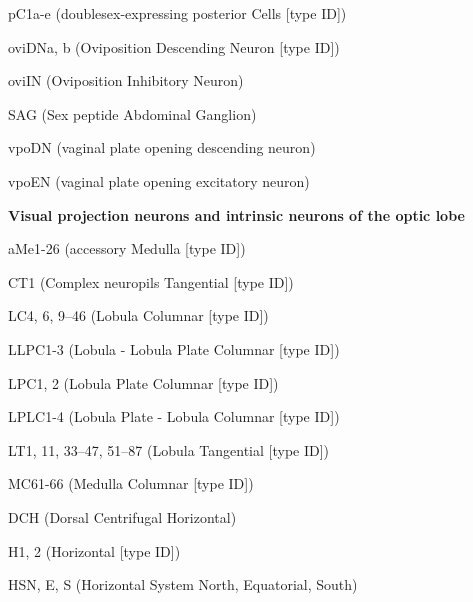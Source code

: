 \documentclass{article}
\begin{document}
{\noindent\hspace*{1.0em}pC1a-e (doublesex-expressing posterior Cells [type ID])\par
\noindent\hspace*{1.0em}oviDNa, b (Oviposition Descending Neuron [type ID])\par
\noindent\hspace*{1.0em}oviIN (Oviposition Inhibitory Neuron)\par
\noindent\hspace*{1.0em}SAG (Sex peptide Abdominal Ganglion)\par
\noindent\hspace*{1.0em}vpoDN (vaginal plate opening descending neuron)\par
\noindent\hspace*{1.0em}vpoEN (vaginal plate opening excitatory neuron)\par
\noindent\textbf{Visual projection neurons and intrinsic neurons of the optic lobe}\par
\noindent\hspace*{1.0em}aMe1-26 (accessory Medulla [type ID])\par
\noindent\hspace*{1.0em}CT1 (Complex neuropils Tangential [type ID])\par
\noindent\hspace*{1.0em}LC4, 6, 9–46 (Lobula Columnar [type ID])\par
\noindent\hspace*{1.0em}LLPC1-3 (Lobula - Lobula Plate Columnar [type ID])\par
\noindent\hspace*{1.0em}LPC1, 2 (Lobula Plate Columnar [type ID])\par
\noindent\hspace*{1.0em}LPLC1-4 (Lobula Plate - Lobula Columnar [type ID])\par
\noindent\hspace*{1.0em}LT1, 11, 33–47, 51–87 (Lobula Tangential [type ID])\par
\noindent\hspace*{1.0em}MC61-66 (Medulla Columnar [type ID])\par
\noindent\hspace*{1.0em}DCH (Dorsal Centrifugal Horizontal)\par
\noindent\hspace*{1.0em}H1, 2 (Horizontal [type ID])\par
\noindent\hspace*{1.0em}HSN, E, S (Horizontal System North, Equatorial, South)\par
}
\end{document}
